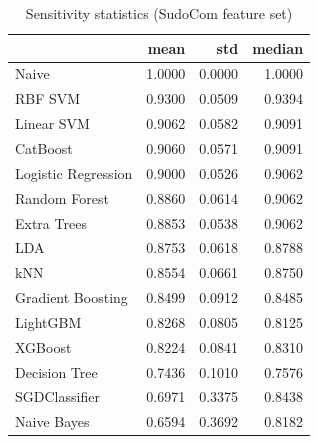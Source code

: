 \begin{table}
\caption{Sensitivity statistics (SudoCom feature set)}
\label{tab:sensitivity_SudoCom_stats}
\begin{tabular}{lrrr}
\toprule
 & mean & std & median \\
\midrule
Naive & 1.0000 & 0.0000 & 1.0000 \\
RBF SVM & 0.9300 & 0.0509 & 0.9394 \\
Linear SVM & 0.9062 & 0.0582 & 0.9091 \\
CatBoost & 0.9060 & 0.0571 & 0.9091 \\
Logistic Regression & 0.9000 & 0.0526 & 0.9062 \\
Random Forest & 0.8860 & 0.0614 & 0.9062 \\
Extra Trees & 0.8853 & 0.0538 & 0.9062 \\
LDA & 0.8753 & 0.0618 & 0.8788 \\
kNN & 0.8554 & 0.0661 & 0.8750 \\
Gradient Boosting & 0.8499 & 0.0912 & 0.8485 \\
LightGBM & 0.8268 & 0.0805 & 0.8125 \\
XGBoost & 0.8224 & 0.0841 & 0.8310 \\
Decision Tree & 0.7436 & 0.1010 & 0.7576 \\
SGDClassifier & 0.6971 & 0.3375 & 0.8438 \\
Naive Bayes & 0.6594 & 0.3692 & 0.8182 \\
\bottomrule
\end{tabular}
\end{table}
